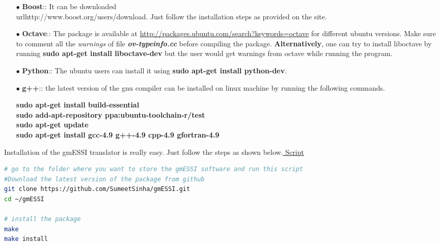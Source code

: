 \documentclass[11pt]{article}
\begin{document}
\begin{itemize}

  \item[$\bullet$] \textbf{Boost}:: It can be downloaded
  \\url{http://www.boost.org/users/download}. Just follow the installation
  steps as provided on the site.

  \item[$\bullet$] \textbf{Octave}:: The package is available at
  \url{http://packages.ubuntu.com/search?keywords=octave} for different
  ubuntu versions. Make sure to comment all the \textit{warnings} of file
  \textit{\textbf{ov-typeinfo.cc}} before compiling the package.
  \textbf{Alternatively}, one can try to install liboctave by running
  \textbf{sudo apt-get install liboctave-dev} but the user would get warnings
  from octave while running the program.

  \item[$\bullet$] \textbf{Python}:: The ubuntu users can install it using
  \textbf{sudo apt-get install python-dev}.

  \item[$\bullet$] \textbf{g++}:: the latest version of the gnu compiler can
  be installed on linux machine by running the following commands.

  \textbf{sudo apt-get install build-essential}\\   
  \textbf{sudo add-apt-repository ppa:ubuntu-toolchain-r/test} \\ 
  \textbf{sudo apt-get update}\\
  \textbf{sudo apt-get install gcc-4.9 g++-4.9 cpp-4.9 gfortran-4.9} 

\end{itemize}

Installation of the gmESSI translator is really easy. Just follow the steps as
shown below.\href{http://beta.sumeetsinha.in/gmESSI/Install.sh}{ Script}

\begin{lstlisting}[language=bash]
# go to the folder where you want to store the gmESSI software and run this script
#Download the latest version of the package from github
git clone https://github.com/SumeetSinha/gmESSI.git
cd ~/gmESSI

# install the package 
make
make install

\end{lstlisting}

\end{document}
